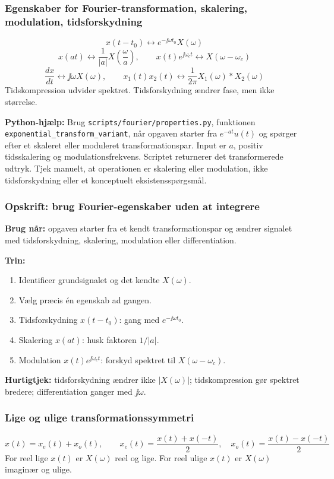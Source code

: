 \subsubsection{Egenskaber for Fourier-transformation, skalering, modulation, tidsforskydning}
\[
x(t-t_0)\leftrightarrow e^{-\jj\omega t_0}X(\omega)
\]
\[
x(at)\leftrightarrow \frac{1}{|a|}X\left(\frac{\omega}{a}\right),\qquad
x(t)e^{\jj\omega_ct}\leftrightarrow X(\omega-\omega_c)
\]
\[
\frac{dx}{dt}\leftrightarrow \jj\omega X(\omega),\qquad
x_1(t)x_2(t)\leftrightarrow \frac{1}{2\pi}X_1(\omega)*X_2(\omega)
\]
Tidskompression udvider spektret. Tidsforskydning ændrer fase, men ikke størrelse.

\textbf{Python-hjælp:} Brug \texttt{scripts/fourier/properties.py}, funktionen \texttt{exponential\_transform\_variant}, når opgaven starter fra \(e^{-at}u(t)\) og spørger efter et skaleret eller moduleret transformationspar. Input er \(a\), positiv tidsskalering og modulationsfrekvens. Scriptet returnerer det transformerede udtryk. Tjek manuelt, at operationen er skalering eller modulation, ikke tidsforskydning eller et konceptuelt eksistensspørgsmål.

\subsubsection{Opskrift: brug Fourier-egenskaber uden at integrere}
\textbf{Brug når:} opgaven starter fra et kendt transformationspar og ændrer signalet med tidsforskydning, skalering, modulation eller differentiation.

\textbf{Trin:}
\begin{enumerate}
    \item Identificer grundsignalet og det kendte \(X(\omega)\).
    \item Vælg præcis én egenskab ad gangen.
    \item Tidsforskydning \(x(t-t_0)\): gang med \(e^{-\jj\omega t_0}\).
    \item Skalering \(x(at)\): husk faktoren \(1/|a|\).
    \item Modulation \(x(t)e^{\jj\omega_ct}\): forskyd spektret til \(X(\omega-\omega_c)\).
\end{enumerate}

\textbf{Hurtigtjek:} tidsforskydning ændrer ikke \(|X(\omega)|\); tidskompression gør spektret bredere; differentiation ganger med \(\jj\omega\).

\subsubsection{Lige og ulige transformationssymmetri}
\[
x(t)=x_e(t)+x_o(t),\qquad
x_e(t)=\frac{x(t)+x(-t)}{2},\quad x_o(t)=\frac{x(t)-x(-t)}{2}
\]
For reel lige \(x(t)\) er \(X(\omega)\) reel og lige. For reel ulige \(x(t)\) er \(X(\omega)\) imaginær og ulige.

